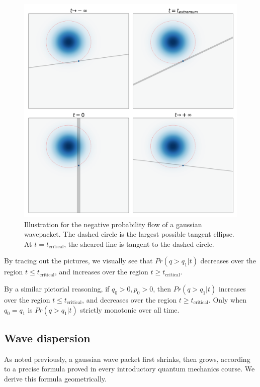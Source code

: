 \begin{figure}
\centering
\includegraphics{figure/negative_probability_flow.png}
\caption{Illustration for the negative probability flow of a gaussian
wavepacket. The dashed circle is the largest possible tangent ellipse.
At $t = t_{\text{critical}}$, the sheared line is tangent to the
dashed circle.}
\end{figure}

By tracing out the pictures, we visually see that $Pr(q > q_1|t)$
decreases over the region $t \leq t_{\text{critical}}$, and increases
over the region $t \geq t_{\text{critical}}$.

By a similar pictorial reasoning, if $q_0 > 0, p_0 > 0$, then
$Pr(q > q_1|t)$ increases over the region
$t \leq t_{\text{critical}}$, and decreases over the region
$t \geq t_{\text{critical}}$. Only when $q_0 = q_1$ is
$Pr(q > q_1|t)$ strictly monotonic over all time.

\subsection{Wave dispersion}

As noted previously, a gaussian wave packet first shrinks, then grows,
according to a precise formula proved in every introductory quantum
mechanics course. We derive this formula geometrically.

